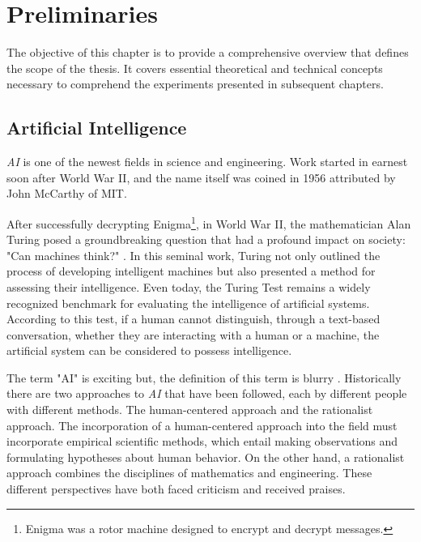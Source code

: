 \chapter{Preliminaries}
\label{cap:prelim}

The objective of this chapter is to provide a comprehensive overview that
defines the scope of the thesis. It covers essential theoretical and technical
concepts necessary to comprehend the experiments presented in subsequent
chapters.

\section{Artificial Intelligence}

\textit{AI} is one of the newest fields in science and engineering. Work
started in earnest soon after World War II, and the name itself was coined in
1956 attributed by John McCarthy of MIT. \newline

After successfully decrypting Enigma\footnote{Enigma was a rotor machine
designed to encrypt and decrypt messages.}, in World War II, the mathematician
Alan Turing posed a groundbreaking question that had a profound impact on
society: "Can machines think?" \cite{CanMachineThink}. In this seminal work,
Turing not only outlined the process of developing intelligent machines but
also presented a method for assessing their intelligence. Even today, the
Turing Test remains a widely recognized benchmark for evaluating the
intelligence of artificial systems. According to this test, if a human cannot
distinguish, through a text-based conversation, whether they are interacting
with a human or a machine, the artificial system can be considered to possess
intelligence. \newline

The term "AI" is exciting but, the definition of this term is blurry
\cite{AIModernApprouch}. Historically there are two approaches to \textit{AI}
that have been followed, each by different people with different methods. The
human-centered approach and the rationalist approach. The incorporation of a
human-centered approach into the field must incorporate empirical scientific
methods, which entail making observations and formulating hypotheses about
human behavior. On the other hand, a rationalist approach combines the
disciplines of mathematics and engineering. These different perspectives have
both faced criticism and received praises. \newline

